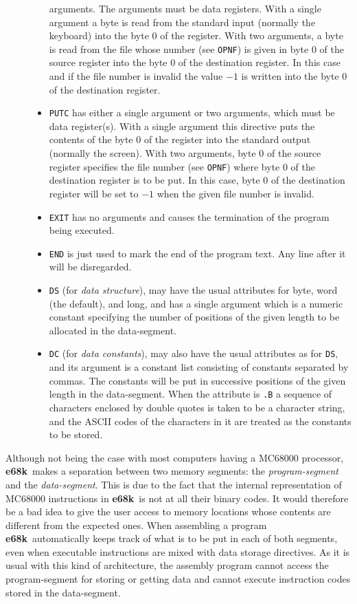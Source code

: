 \documentclass[a4,11pt]{article}
\newcommand{\esek}{{\bf e68k}}
\newcommand{\comm}[1]{{\tt #1}}
\begin{document}
\begin{description}
\begin{itemize}
arguments. The arguments must be data registers. With a single argument a
byte is read from the standard input (normally the keyboard) into the
byte 0 of the register. With two arguments, a byte is read from the
file whose number (see \comm{OPNF}) is given in byte 0 of the source register
into the byte 0 of the destination register. In this case and if the
file number is invalid the value $-1$ is written into the byte 0 of the
destination register.
\item \comm{PUTC} has either a single argument or two arguments, which
must be data register(s). With a single argument this directive
puts the contents of the byte 0 of the register into the standard output
(normally the screen). With two arguments, byte 0 of the source register
specifies the file number (see \comm{OPNF}) where byte 0 of the
destination register is to be put. In this case, byte 0 of the destination
register will be set to $-1$ when the given file number is invalid.
\item \comm{EXIT} has no arguments and causes the termination of the
program being executed.
\item \comm{END} is just used to mark the end of the program text. Any
line after it will be disregarded.
\item \comm{DS} (for {\em data structure}), may have the usual
attributes for byte, word (the default), and long, and has a single
argument which is a numeric
constant specifying the number of positions of the given length to be
allocated in the data-segment.
\item \comm{DC} (for {\em data constants}), may also have the usual
attributes as for \comm{DS}, and its argument is a constant list
consisting of constants separated by commas. The constants will be put
in successive positions of the given length in the data-segment. When
the attribute is \comm{.B} a sequence of characters enclosed by double
quotes is taken to be a character string, and the ASCII codes of the
characters in it are treated as the constants to be stored. \end{itemize}
\end{description}

Although not being the case with most computers having a MC68000
processor, \esek\    makes a separation between two memory segments:
the {\em program-segment} and the {\em data-segment}. This is due to
the fact that the internal representation of MC68000 instructions in \esek\   
is not at all their binary codes. It would therefore be a bad idea to
give the user access to memory locations whose contents are different
from the expected ones. When assembling a program \esek\   
automatically keeps track of what is to be put in each of both
segments, even when executable instructions are mixed with data
storage directives. As it is usual with this kind of architecture, the
assembly program cannot access the program-segment for storing or
getting data and cannot execute instruction codes
stored in the data-segment.
\end{document}
